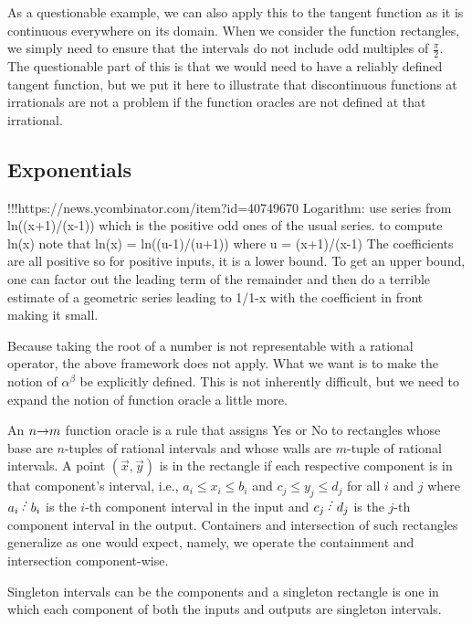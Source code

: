 \documentclass[12pt]{article}
\begin{document}
As a questionable example, we can also apply this to the tangent function as it is continuous everywhere on its domain. When we consider the function rectangles, we simply need to ensure that the intervals do not include odd multiples of $\frac{\pi}{2}$. The questionable part of this is that we would need to have a reliably defined tangent function, but we put it here to illustrate that discontinuous functions at irrationals are not a problem if the function oracles are not defined at that irrational. 

\subsection{Exponentials}

!!!https://news.ycombinator.com/item?id=40749670
Logarithm: use series from ln((x+1)/(x-1)) which is the positive odd ones of the usual series. to compute ln(x) note that ln(x) = ln((u-1)/(u+1)) where u = (x+1)/(x-1)
The coefficients are all positive so for positive inputs, it is a lower bound. To get an upper bound, one can factor out the leading term of the remainder and then do a terrible estimate of a geometric series leading to 1/1-x  with the coefficient in front making it small. 


Because taking the root of a number is not representable with a rational operator, the above framework does not apply. What we want is to make the notion of $\alpha^{\beta}$ be explicitly defined. This is not inherently difficult, but we need to expand the notion of function oracle a little more.

An $n \mathord{\rightarrow} m$ function oracle is a rule that assigns Yes or No to rectangles whose base are $n$-tuples of rational intervals and whose walls are $m$-tuple of rational intervals. A point $(\vec{x}, \vec{y})$ is in the rectangle if each respective component is in that component's interval, i.e.,  $a_i \leq x_i \leq b_i$ and $c_j \leq y_j \leq d_j$ for all $i$ and $j$ where $a_i \lte b_i$ is the $i$-th component interval in the input and $c_j \lte d_j$ is the $j$-th component interval in the output. Containers and intersection of such rectangles generalize as one would expect, namely, we operate the containment and intersection component-wise. 

Singleton intervals can be the components and a singleton rectangle is one in which each component of both the inputs and outputs are singleton intervals. 
\end{document}
